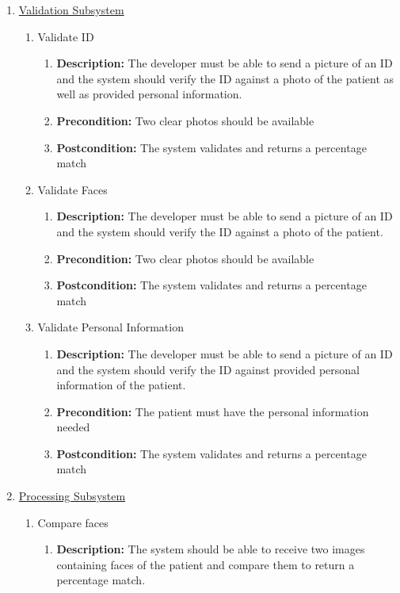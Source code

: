 \documentclass{article}
\begin{document}
		\begin{enumerate}
			\item \underline{Validation Subsystem}
			\begin{enumerate}
				\item Validate ID
				\begin{enumerate}
					\item \textbf{Description:} The developer must be able to send a picture of an ID and the system should verify the ID against a photo of the patient as well as provided personal information.
					\item \textbf{Precondition:} Two clear photos should be available
					\item \textbf{Postcondition:} The system validates and returns a percentage match
				\end{enumerate}
				\item Validate Faces
				\begin{enumerate}
					\item \textbf{Description:} The developer must be able to send a picture of an ID and the system should verify the ID against a photo of the patient.
					\item \textbf{Precondition:} Two clear photos should be available
					\item \textbf{Postcondition:} The system validates and returns a percentage match
				\end{enumerate}
				\item Validate Personal Information
				\begin{enumerate}
					\item \textbf{Description:} The developer must be able to send a picture of an ID and the system should verify the ID against provided personal information of the patient.
					\item \textbf{Precondition:} The patient must have the personal information needed
					\item \textbf{Postcondition:} The system validates and returns a percentage match
				\end{enumerate}
			\end{enumerate}
			\item \underline{Processing Subsystem}
			\begin{enumerate}
				\item Compare faces
				\begin{enumerate}
					\item \textbf{Description:} The system should be able to receive two images containing faces of the patient and compare them to return a percentage match.

\end{enumerate}
\end{enumerate}
\end{enumerate}
\end{document}
